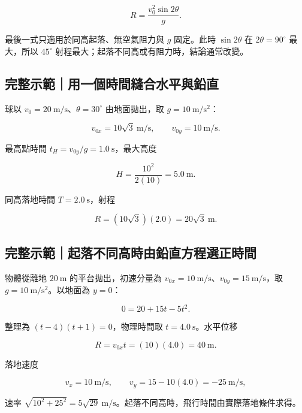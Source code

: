 \documentclass[11pt,a4paper]{article}
\begin{document}
\[
\boxed{R=\frac{v_0^2\sin2\theta}{g}}.
\]

最後一式只適用於同高起落、無空氣阻力與 \(g\) 固定。此時 \(\sin2\theta\) 在 \(2\theta=90^\circ\) 最大，所以 \(45^\circ\) 射程最大；起落不同高或有阻力時，結論通常改變。

\begin{HandoutWorkedExample}

\subsection{完整示範｜用一個時間縫合水平與鉛直}\label{ux5b8cux6574ux793aux7bc4ux7528ux4e00ux500bux6642ux9593ux7e2bux5408ux6c34ux5e73ux8207ux925bux76f4}

球以 \(v_0=20\ \mathrm{m/s}\)、\(\theta=30^\circ\) 由地面拋出，取 \(g=10\ \mathrm{m/s^2}\)：

\[
v_{0x}=10\sqrt3\ \mathrm{m/s},
\qquad
v_{0y}=10\ \mathrm{m/s}.
\]

最高點時間 \(t_H=v_{0y}/g=1.0\ \mathrm{s}\)，最大高度

\[
H=\frac{10^2}{2(10)}=5.0\ \mathrm{m}.
\]

同高落地時間 \(T=2.0\ \mathrm{s}\)，射程

\[
R=(10\sqrt3)(2.0)=20\sqrt3\ \mathrm{m}.
\]

\end{HandoutWorkedExample}

\begin{HandoutWorkedExample}

\subsection{完整示範｜起落不同高時由鉛直方程選正時間}\label{ux5b8cux6574ux793aux7bc4ux8d77ux843dux4e0dux540cux9ad8ux6642ux7531ux925bux76f4ux65b9ux7a0bux9078ux6b63ux6642ux9593}

物體從離地 \(20\ \mathrm m\) 的平台拋出，初速分量為 \(v_{0x}=10\ \mathrm{m/s}\)、\(v_{0y}=15\ \mathrm{m/s}\)，取 \(g=10\ \mathrm{m/s^2}\)。以地面為 \(y=0\)：

\[
0=20+15t-5t^2.
\]

整理為 \((t-4)(t+1)=0\)，物理時間取 \(t=4.0\ \mathrm s\)。水平位移

\[
R=v_{0x}t=(10)(4.0)=40\ \mathrm m.
\]

落地速度

\[
v_x=10\ \mathrm{m/s},\qquad
v_y=15-10(4.0)=-25\ \mathrm{m/s},
\]

速率 \(\sqrt{10^2+25^2}=5\sqrt{29}\ \mathrm{m/s}\)。起落不同高時，飛行時間由實際落地條件求得。

\end{HandoutWorkedExample}
\end{document}
